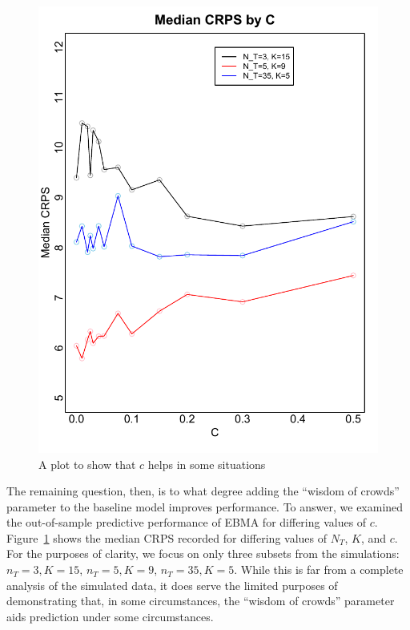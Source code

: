 \documentclass[12pt,fullpage,endnotes]{article}
\begin{document}
\begin{figure}[ht]
\caption{A plot to show that $c$ helps in some situations}
\label{simplot2}
\centering
\includegraphics[scale=.8]{SimTemp2}
\end{figure}

The remaining question, then, is to what degree adding the ``wisdom of
crowds'' parameter to the baseline model improves performance.  To
answer, we examined the out-of-sample predictive performance of EBMA
for differing values of $c$. Figure~\ref{simplot2} shows the median
CRPS recorded for differing values of $N_T$, $K$, and $c$.  For the
purposes of clarity, we focus on only three subsets from the
simulations: $n_T=3, K=15$, $n_T=5, K=9$, $n_T=35, K=5$.  While this
is far from a complete analysis of the simulated data, it does serve
the limited purposes of demonstrating that, in some circumstances, the
``wisdom of crowds'' parameter aids prediction under some
circumstances.
\end{document}
